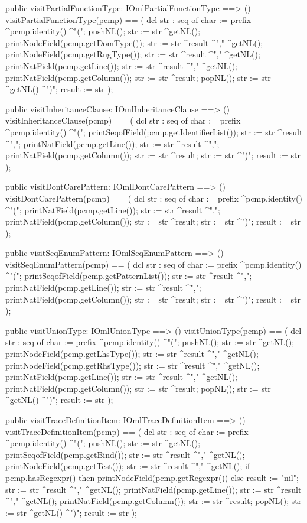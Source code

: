 \begin{vdm_al}
  public visitPartialFunctionType: IOmlPartialFunctionType ==> ()
  visitPartialFunctionType(pcmp) ==
    ( dcl str : seq of char := prefix ^pcmp.identity() ^"(";
      pushNL();
      str := str ^getNL();
      printNodeField(pcmp.getDomType());
      str := str ^result ^"," ^getNL();
      printNodeField(pcmp.getRngType());
      str := str ^result ^"," ^getNL();
      printNatField(pcmp.getLine());
      str := str ^result ^"," ^getNL();
      printNatField(pcmp.getColumn());
      str := str ^result;
      popNL();
      str := str ^getNL() ^")";
      result := str );

  public visitInheritanceClause: IOmlInheritanceClause ==> ()
  visitInheritanceClause(pcmp) ==
    ( dcl str : seq of char := prefix ^pcmp.identity() ^"(";
      printSeqofField(pcmp.getIdentifierList());
      str := str ^result ^",";
      printNatField(pcmp.getLine());
      str := str ^result ^",";
      printNatField(pcmp.getColumn());
      str := str ^result;
      str := str ^")";
      result := str );

  public visitDontCarePattern: IOmlDontCarePattern ==> ()
  visitDontCarePattern(pcmp) ==
    ( dcl str : seq of char := prefix ^pcmp.identity() ^"(";
      printNatField(pcmp.getLine());
      str := str ^result ^",";
      printNatField(pcmp.getColumn());
      str := str ^result;
      str := str ^")";
      result := str );

  public visitSeqEnumPattern: IOmlSeqEnumPattern ==> ()
  visitSeqEnumPattern(pcmp) ==
    ( dcl str : seq of char := prefix ^pcmp.identity() ^"(";
      printSeqofField(pcmp.getPatternList());
      str := str ^result ^",";
      printNatField(pcmp.getLine());
      str := str ^result ^",";
      printNatField(pcmp.getColumn());
      str := str ^result;
      str := str ^")";
      result := str );

  public visitUnionType: IOmlUnionType ==> ()
  visitUnionType(pcmp) ==
    ( dcl str : seq of char := prefix ^pcmp.identity() ^"(";
      pushNL();
      str := str ^getNL();
      printNodeField(pcmp.getLhsType());
      str := str ^result ^"," ^getNL();
      printNodeField(pcmp.getRhsType());
      str := str ^result ^"," ^getNL();
      printNatField(pcmp.getLine());
      str := str ^result ^"," ^getNL();
      printNatField(pcmp.getColumn());
      str := str ^result;
      popNL();
      str := str ^getNL() ^")";
      result := str );

  public visitTraceDefinitionItem: IOmlTraceDefinitionItem ==> ()
  visitTraceDefinitionItem(pcmp) ==
    ( dcl str : seq of char := prefix ^pcmp.identity() ^"(";
      pushNL();
      str := str ^getNL();
      printSeqofField(pcmp.getBind());
      str := str ^result ^"," ^getNL();
      printNodeField(pcmp.getTest());
      str := str ^result ^"," ^getNL();
      if pcmp.hasRegexpr()
      then printNodeField(pcmp.getRegexpr())
      else result := "nil";
      str := str ^result ^"," ^getNL();
      printNatField(pcmp.getLine());
      str := str ^result ^"," ^getNL();
      printNatField(pcmp.getColumn());
      str := str ^result;
      popNL();
      str := str ^getNL() ^")";
      result := str );


\end{vdm_al}
